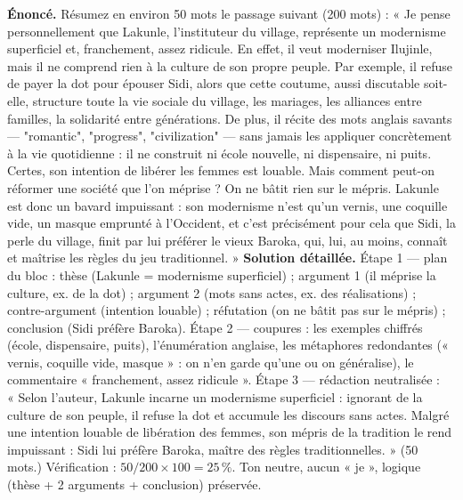 \documentclass[11pt]{article}
\begin{document}
\begin{exoresolu}
\textbf{Énoncé.} Résumez en environ 50 mots le passage suivant (200 mots) : « Je pense personnellement que Lakunle, l'instituteur du village, représente un modernisme superficiel et, franchement, assez ridicule. En effet, il veut moderniser Ilujinle, mais il ne comprend rien à la culture de son propre peuple. Par exemple, il refuse de payer la dot pour épouser Sidi, alors que cette coutume, aussi discutable soit-elle, structure toute la vie sociale du village, les mariages, les alliances entre familles, la solidarité entre générations. De plus, il récite des mots anglais savants — "romantic", "progress", "civilization" — sans jamais les appliquer concrètement à la vie quotidienne : il ne construit ni école nouvelle, ni dispensaire, ni puits. Certes, son intention de libérer les femmes est louable. Mais comment peut-on réformer une société que l'on méprise ? On ne bâtit rien sur le mépris. Lakunle est donc un bavard impuissant : son modernisme n'est qu'un vernis, une coquille vide, un masque emprunté à l'Occident, et c'est précisément pour cela que Sidi, la perle du village, finit par lui préférer le vieux Baroka, qui, lui, au moins, connaît et maîtrise les règles du jeu traditionnel. »
\tcblower
\textbf{Solution détaillée.} Étape 1 — plan du bloc : thèse (Lakunle = modernisme superficiel) ; argument 1 (il méprise la culture, ex. de la dot) ; argument 2 (mots sans actes, ex. des réalisations) ; contre-argument (intention louable) ; réfutation (on ne bâtit pas sur le mépris) ; conclusion (Sidi préfère Baroka). Étape 2 — coupures : les exemples chiffrés (école, dispensaire, puits), l'énumération anglaise, les métaphores redondantes (« vernis, coquille vide, masque » : on n'en garde qu'une ou on généralise), le commentaire « franchement, assez ridicule ». Étape 3 — rédaction neutralisée :\\
« Selon l'auteur, Lakunle incarne un modernisme superficiel : ignorant de la culture de son peuple, il refuse la dot et accumule les discours sans actes. Malgré une intention louable de libération des femmes, son mépris de la tradition le rend impuissant : Sidi lui préfère Baroka, maître des règles traditionnelles. » (50 mots.) Vérification : $50/200 \times 100 = 25\,\%$. Ton neutre, aucun « je », logique (thèse + 2 arguments + conclusion) préservée.
\end{exoresolu}
\end{document}
